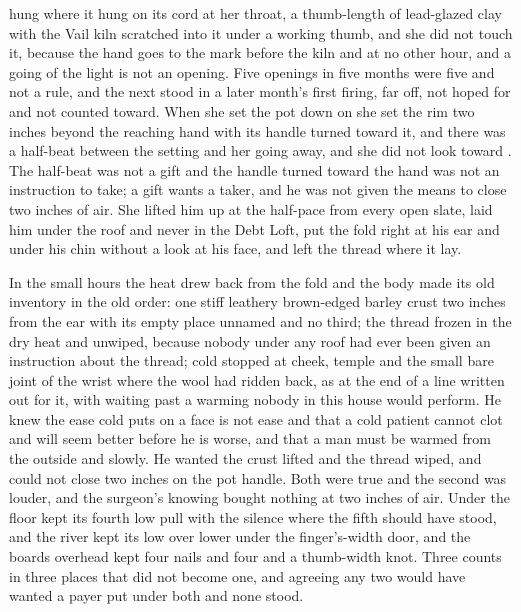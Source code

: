  hung where it hung on its cord at her throat, a thumb-length of lead-glazed clay with the Vail kiln scratched into it under a working thumb, and she did not touch it, because the hand goes to the mark before the kiln and at no other hour, and a going of the light is not an opening. Five openings in five months were five and not a rule, and the next stood in a later month's first firing, far off, not hoped for and not counted toward. When she set the pot down on  she set the rim two inches beyond the reaching hand with its handle turned toward it, and there was a half-beat between the setting and her going away, and she did not look toward . The half-beat was not a gift and the handle turned toward the hand was not an instruction to take; a gift wants a taker, and he was not given the means to close two inches of air. She lifted him up at the half-pace from every open slate, laid him under the roof and never in the Debt Loft, put the fold right at his ear and under his chin without a look at his face, and left the thread where it lay.

In the small hours the heat drew back from the fold and the body made its old inventory in the old order: one stiff leathery brown-edged barley crust two inches from the ear with its empty place unnamed and no third; the thread frozen in the dry heat and unwiped, because nobody under any roof had ever been given an instruction about the thread; cold stopped at cheek, temple and the small bare joint of the wrist where the wool had ridden back, as at the end of a line written out for it, with  waiting past a warming nobody in this house would perform. He knew the ease cold puts on a face is not ease and that a cold patient cannot clot and will seem better before he is worse, and that a man must be warmed from the outside and slowly. He wanted the crust lifted and the thread wiped, and could not close two inches on the pot handle. Both were true and the second was louder, and the surgeon's knowing bought nothing at two inches of air. Under the floor  kept its fourth low pull with the silence where the fifth should have stood, and the river kept its  low over lower under the finger's-width door, and the boards overhead kept four nails and four and a thumb-width knot. Three counts in three places that did not become one, and agreeing any two would have wanted a payer put under both and none stood.

